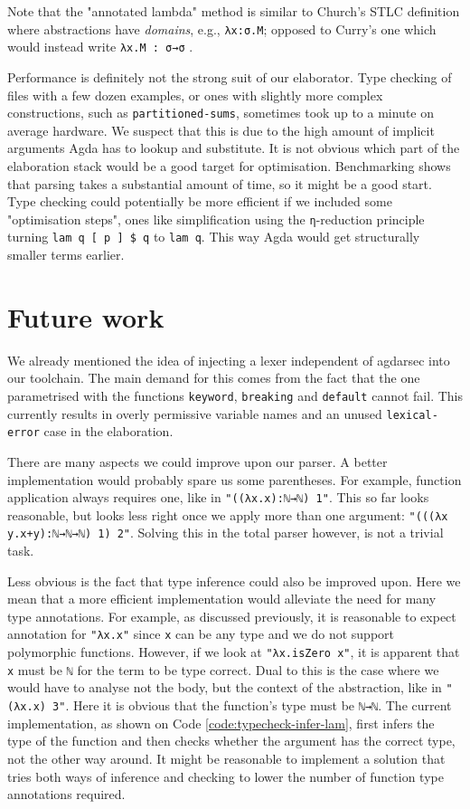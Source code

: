 Note that the "annotated lambda" method is similar to Church's STLC definition where abstractions have \textit{domains}, e.g., \verb$λx:σ.M$; opposed to Curry's one which would instead write \verb$λx.M : σ→σ$ \cite{sorensen1998curry}.

Performance is definitely not the strong suit of our elaborator. Type checking of files with a few dozen examples, or ones with slightly more complex constructions, such as \verb$partitioned-sums$, sometimes took up to a minute on average hardware. We suspect that this is due to the high amount of implicit arguments Agda has to lookup and substitute. It is not obvious which part of the elaboration stack would be a good target for optimisation. Benchmarking shows that parsing takes a substantial amount of time, so it might be a good start. Type checking could potentially be more efficient if we included some "optimisation steps", ones like simplification using the \verb$η$-reduction principle turning \verb$lam q [ p ] $\verb$$\verb=$=\verb$$\verb$ q$ to \verb$lam q$. This way Agda would get structurally smaller terms earlier.

\section{Future work}

We already mentioned the idea of injecting a lexer independent of agdarsec into our toolchain. The main demand for this comes from the fact that the one parametrised with the functions \verb$keyword$, \verb$breaking$ and \verb$default$ cannot fail. This currently results in overly permissive variable names and an unused \verb$lexical-error$ case in the elaboration.

There are many aspects we could improve upon our parser. A better implementation would probably spare us some parentheses. For example, function application always requires one, like in \verb$"((λx.x):ℕ→ℕ) 1"$. This so far looks reasonable, but looks less right once we apply more than one argument: \verb$"(((λx y.x+y):ℕ→ℕ→ℕ) 1) 2"$. Solving this in the total parser however, is not a trivial task.

Less obvious is the fact that type inference could also be improved upon. Here we mean that a more efficient implementation would alleviate the need for many type annotations. For example, as discussed previously, it is reasonable to expect annotation for \verb$"λx.x"$ since \verb$x$ can be any type and we do not support polymorphic functions. However, if we look at \verb$"λx.isZero x"$, it is apparent that \verb$x$ must be \verb$ℕ$ for the term to be type correct. Dual to this is the case where we would have to analyse not the body, but the context of the abstraction, like in \verb$"(λx.x) 3"$. Here it is obvious that the function's type must be \verb$ℕ→ℕ$. The current implementation, as shown on Code \ref{code:typecheck-infer-lam}, first infers the type of the function and then checks whether the argument has the correct type, not the other way around. It might be reasonable to implement a solution that tries both ways of inference and checking to lower the number of function type annotations required.


